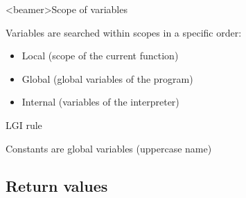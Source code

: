 \begin{frame}<beamer>{Scope of variables}

  Variables are searched within scopes in a specific order:

  \begin{itemize}
    \item<1-> Local (scope of the current function)
    \item<2-> Global (global variables of the program)
    \item<3-> Internal (variables of the interpreter)
  \end{itemize}

  \bigskip

   LGI rule

  \medskip

   Constants are global variables (uppercase name)

\end{frame}

\subsection{Return values}


